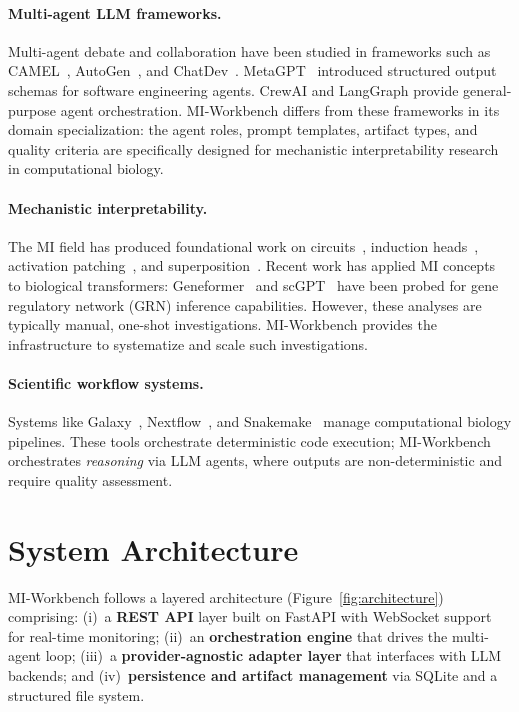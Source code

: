 \documentclass[11pt,a4paper]{article}
\begin{document}
\paragraph{Multi-agent LLM frameworks.}
Multi-agent debate and collaboration have been studied in frameworks such as CAMEL~\citep{li2023camel}, AutoGen~\citep{wu2023autogen}, and ChatDev~\citep{qian2024chatdev}.
MetaGPT~\citep{hong2023metagpt} introduced structured output schemas for software engineering agents.
CrewAI and LangGraph provide general-purpose agent orchestration.
MI-Workbench differs from these frameworks in its domain specialization: the agent roles, prompt templates, artifact types, and quality criteria are specifically designed for mechanistic interpretability research in computational biology.

\paragraph{Mechanistic interpretability.}
The MI field has produced foundational work on circuits~\citep{olah2020zoom}, induction heads~\citep{olsson2022context}, activation patching~\citep{meng2022locating}, and superposition~\citep{elhage2022toy}.
Recent work has applied MI concepts to biological transformers: Geneformer~\citep{theodoris2023transfer} and scGPT~\citep{cui2024scgpt} have been probed for gene regulatory network (GRN) inference capabilities.
However, these analyses are typically manual, one-shot investigations.
MI-Workbench provides the infrastructure to systematize and scale such investigations.

\paragraph{Scientific workflow systems.}
Systems like Galaxy~\citep{afgan2018galaxy}, Nextflow~\citep{ditommaso2017nextflow}, and Snakemake~\citep{molder2021sustainable} manage computational biology pipelines.
These tools orchestrate deterministic code execution; MI-Workbench orchestrates \emph{reasoning} via LLM agents, where outputs are non-deterministic and require quality assessment.


\section{System Architecture}
\label{sec:architecture}

MI-Workbench follows a layered architecture (Figure~\ref{fig:architecture}) comprising: (i)~a \textbf{REST API} layer built on FastAPI with WebSocket support for real-time monitoring; (ii)~an \textbf{orchestration engine} that drives the multi-agent loop; (iii)~a \textbf{provider-agnostic adapter layer} that interfaces with LLM backends; and (iv)~\textbf{persistence and artifact management} via SQLite and a structured file system.
\end{document}
